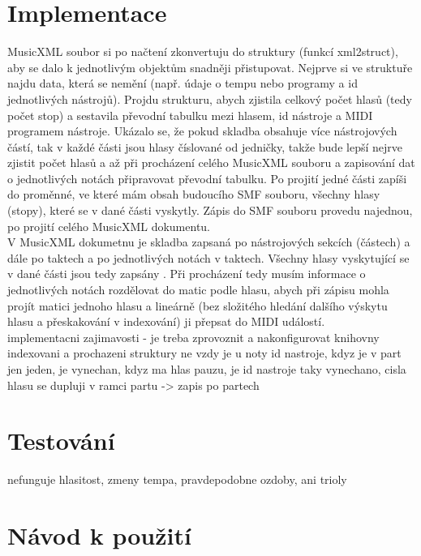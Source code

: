\documentclass[12pt,a4paper,titlepage]{article}
\begin{document}
\section{Implementace}
MusicXML soubor si po načtení zkonvertuju do struktury (funkcí xml2struct), aby se dalo k jednotlivým objektům snadněji přistupovat. Nejprve si ve struktuře najdu data, která se nemění (např. údaje o tempu nebo programy a id jednotlivých nástrojů). Projdu strukturu, abych zjistila celkový počet hlasů (tedy počet stop) a sestavila převodní tabulku mezi hlasem, id nástroje a MIDI programem nástroje. Ukázalo se, že pokud skladba obsahuje více nástrojových částí, tak v každé části jsou hlasy číslované od jedničky, takže bude lepší nejrve zjistit počet hlasů a až při procházení celého MusicXML souboru a zapisování dat o jednotlivých notách připravovat převodní tabulku. Po projití jedné části zapíši do proměnné, ve které mám obsah budoucího SMF souboru, všechny hlasy (stopy), které se v dané části vyskytly. Zápis do SMF souboru provedu najednou, po projití celého MusicXML dokumentu.\\
V MusicXML dokumetnu je skladba zapsaná po nástrojových sekcích (částech) a dále po taktech a po jednotlivých notách v taktech. Všechny hlasy vyskytující se v dané části jsou tedy zapsány . Při procházení tedy musím informace o jednotlivých notách rozdělovat do matic podle hlasu, abych při zápisu mohla projít matici jednoho hlasu a lineárně (bez složitého hledání dalšího výskytu hlasu a přeskakování v indexování) ji přepsat do MIDI událostí.\\

implementacni zajimavosti - je treba zprovoznit a nakonfigurovat knihovny
indexovani a prochazeni struktury
ne vzdy je u noty id nastroje, kdyz je v part jen jeden, je vynechan, kdyz ma hlas pauzu, je id nastroje taky vynechano, cisla hlasu se dupluji v ramci partu -> zapis po partech
\section{Testování}
nefunguje hlasitost, zmeny tempa, pravdepodobne ozdoby, ani trioly
\section{Návod k použití}
\end{document}
